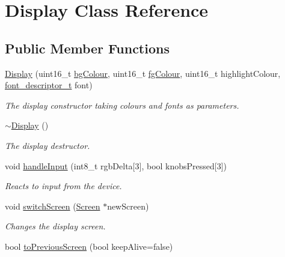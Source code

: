 \hypertarget{classDisplay}{}\section{Display Class Reference}
\label{classDisplay}
\subsection*{Public Member Functions}
\begin{DoxyCompactItemize}
\item 
\mbox{\hyperlink{classDisplay_a579fdca9754b50088f77dcb7ba3489ac}{Display}} (uint16\+\_\+t \mbox{\hyperlink{classDisplay_a23a0f9867d7ba82c45a3c612c84e0504}{bg\+Colour}}, uint16\+\_\+t \mbox{\hyperlink{classDisplay_aa6a2bd6e8f05a0794ff6b32c30723245}{fg\+Colour}}, uint16\+\_\+t highlight\+Colour, \mbox{\hyperlink{structfont__descriptor__t}{font\+\_\+descriptor\+\_\+t}} font)
\begin{DoxyCompactList}\small\item\em The display constructor taking colours and fonts as parameters. \end{DoxyCompactList}\item 
\mbox{\label{classDisplay_ac2607a6bb236c55547a4223d40d85d1f}} 
\mbox{\hyperlink{classDisplay_ac2607a6bb236c55547a4223d40d85d1f}{$\sim$\+Display}} ()
\begin{DoxyCompactList}\small\item\em The display destructor. \end{DoxyCompactList}\item 
void \mbox{\hyperlink{classDisplay_aa68ef5d785a1a96abdfe0a0f8ccdc379}{handle\+Input}} (int8\+\_\+t rgb\+Delta\mbox{[}3\mbox{]}, bool knobs\+Pressed\mbox{[}3\mbox{]})
\begin{DoxyCompactList}\small\item\em Reacts to input from the device. \end{DoxyCompactList}\item 
void \mbox{\hyperlink{classDisplay_a566e7cbce9f606a20787c6d42c189dc2}{switch\+Screen}} (\mbox{\hyperlink{classScreen}{Screen}} $\ast$new\+Screen)
\begin{DoxyCompactList}\small\item\em Changes the display screen. \end{DoxyCompactList}\item 
bool \mbox{\hyperlink{classDisplay_ad043404964c19f51bb903da796aaefda}{to\+Previous\+Screen}} (bool keep\+Alive=false)

\end{DoxyCompactItemize}
